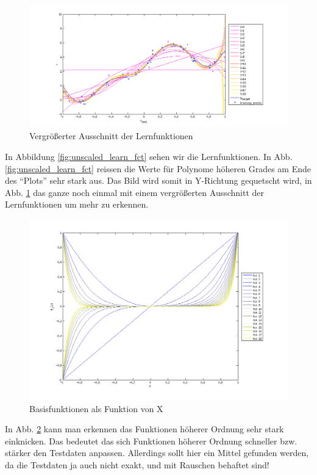 \begin{figure}[hp!]
\begin{center}
 \includegraphics[width=1\textwidth]{./figures/1_1_1_scal_learn_fct}
 \caption[Vergrö\ss{}erter Ausschnitt der Lernfunktionen]{Vergrö\ss{}erter Ausschnitt der Lernfunktionen}
\label{fig:scal_learn_fct}
\end{center}
\end{figure}

In Abbildung \ref{fig:unscaled_learn_fct} sehen wir die Lernfunktionen.
In Abb. \ref{fig:unscaled_learn_fct} reissen die Werte für Polynome höheren Grades am Ende des ``Plots'' sehr stark aus.
 Das Bild wird somit in Y-Richtung gequetscht wird, in Abb. \ref{fig:scal_learn_fct} das ganze noch einmal mit einem  vergrö\ss{}erten Ausschnitt der Lernfunktionen um mehr zu erkennen.

\begin{figure}[hp!]
\begin{center}
 \includegraphics[width=1\textwidth]{./figures/1_1_1_base_fct}
 \caption[Basisfunktionen als Funktion von X]{Basisfunktionen als Funktion von X}
\label{fig:base_fct}
\end{center}
\end{figure}
In Abb. \ref{fig:base_fct} kann man erkennen das Funktionen höherer Ordnung sehr stark einknicken. Das bedeutet das sich Funktionen höherer Ordnung 
schneller bzw. stärker den Testdaten anpassen. Allerdings sollt hier ein Mittel gefunden werden, da die Testdaten ja auch nicht exakt, und mit
Rauschen behaftet sind! 



